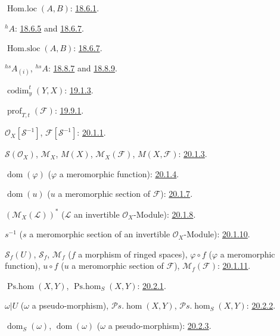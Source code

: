 $\operatorname{Hom.loc}(A,B)$: {\hyperlink{ega4.c04.statement.18-6-1}{18.6.1}}.

${}^{h}A$: {\hyperlink{ega4.c04.def.18-6-5}{18.6.5}} and {\hyperlink{ega4.c04.statement.18-6-7}{18.6.7}}.

$\operatorname{Hom.sloc}(A,B)$: {\hyperlink{ega4.c04.statement.18-6-7}{18.6.7}}.

${}^{hs}A_{(i)}$, ${}^{hs}A$: {\hyperlink{ega4.c04.def.18-8-7}{18.8.7}} and
{\hyperlink{ega4.c04.statement.18-8-9}{18.8.9}}.

$\operatorname{codim}^{t}_{y}(Y,X)$: {\hyperlink{ega4.c04.def.19-1-3}{19.1.3}}.

$\operatorname{prof}_{T,t}(\mathcal F)$: {\hyperlink{ega4.c04.statement.19-9-1}{19.9.1}}.

$\mathcal O_X[\mathcal S^{-1}]$, $\mathcal F[\mathcal S^{-1}]$:
{\hyperlink{ega4.c04.statement.20-1-1}{20.1.1}}.

$\mathcal S(\mathcal O_X)$, $\mathcal M_X$, $M(X)$,
$\mathcal M_X(\mathcal F)$, $M(X,\mathcal F)$:
{\hyperlink{ega4.c04.statement.20-1-3}{20.1.3}}.

$\operatorname{dom}(\varphi)$ ($\varphi$ a meromorphic function):
{\hyperlink{ega4.c04.statement.20-1-4}{20.1.4}}.

$\operatorname{dom}(u)$ ($u$ a meromorphic section of $\mathcal F$):
{\hyperlink{ega4.c04.statement.20-1-7}{20.1.7}}.

$(\mathcal M_X(\mathcal L))^{*}$
($\mathcal L$ an invertible $\mathcal O_X$-Module):
{\hyperlink{ega4.c04.statement.20-1-8}{20.1.8}}.

$s^{-1}$ ($s$ a meromorphic section of an invertible
$\mathcal O_X$-Module): {\hyperlink{ega4.c04.statement.20-1-10}{20.1.10}}.

$\mathcal S_f(U)$, $\mathcal S_f$, $\mathcal M_f$
($f$ a morphism of ringed spaces), $\varphi\circ f$ ($\varphi$ a
meromorphic function), $u\circ f$ ($u$ a meromorphic section of
$\mathcal F$), $\mathcal M_f(\mathcal F)$: {\hyperlink{ega4.c04.statement.20-1-11}{20.1.11}}.

$\operatorname{Ps.hom}(X,Y)$, $\operatorname{Ps.hom}_S(X,Y)$:
{\hyperlink{ega4.c04.statement.20-2-1}{20.2.1}}.

$\omega|U$ ($\omega$ a pseudo-morphism),
$\mathcal P\!s.\operatorname{hom}(X,Y)$,
$\mathcal P\!s.\operatorname{hom}_S(X,Y)$:
{\hyperlink{ega4.c04.statement.20-2-2}{20.2.2}}.

$\operatorname{dom}_S(\omega)$, $\operatorname{dom}(\omega)$
($\omega$ a pseudo-morphism): {\hyperlink{ega4.c04.statement.20-2-3}{20.2.3}}.

